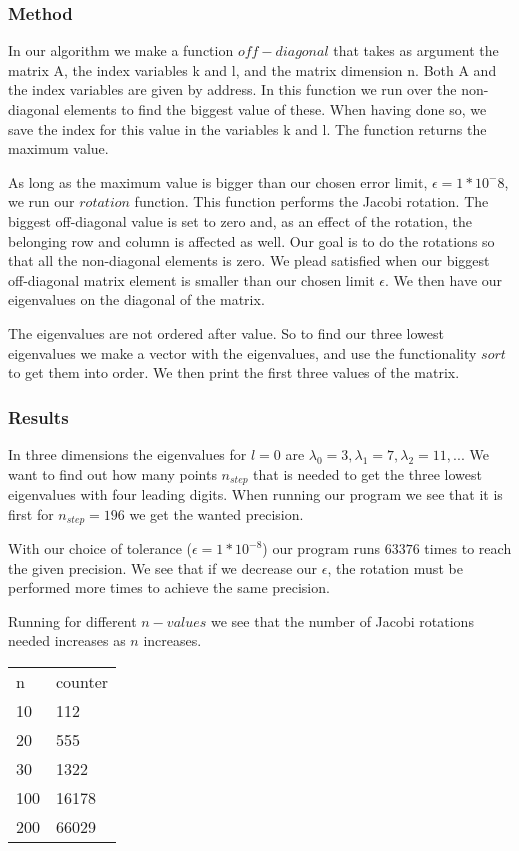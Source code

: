\documentclass[a4paper,12pt, english]{article}
\begin{document}
\subsubsection{Method}
In our algorithm we make a function $off-diagonal$ that takes as argument the matrix A, the index variables k and l, and the matrix dimension n. Both A and the index variables are given by address. In this function we run over the non-diagonal elements to find the biggest value of these. When having done so, we save the index for this value in the variables k and l. The function returns the maximum value. 

As long as the maximum value is bigger than our chosen error limit, $\epsilon = 1*10^-8$, we run our $rotation$ function. This function performs the Jacobi rotation. The biggest off-diagonal value is set to zero and, as an effect of the rotation, the belonging row and column is affected as well. Our goal is to do the rotations so that all the non-diagonal elements is zero. We plead satisfied when our biggest off-diagonal matrix element is smaller than our chosen limit $\epsilon$. We then have our eigenvalues on the diagonal of the matrix.
 
The eigenvalues are not ordered after value. So to find our three lowest eigenvalues we make a vector with the eigenvalues, and use the functionality $sort$ to get them into order. We then print the first three values of the matrix.
 
\subsubsection{Results}
In three dimensions the eigenvalues for $l=0$ are $\lambda_0 = 3, \lambda_1 = 7, \lambda_2 = 11,...$ We want to find out how many points $n_{step}$ that is needed to get the three lowest eigenvalues with four leading digits. When running our program we see that it is first for $n_{step} = 196$ we get the wanted precision. 
 
With our choice of tolerance ($\epsilon = 1*10^{-8}$) our program runs $63376$ times to reach the given precision. We see that if we decrease our $\epsilon$, the rotation must be performed more times to achieve the same precision. 

Running for different $n-values$ we see that the number of Jacobi rotations needed increases as $n$ increases.

\begin{center}
\begin{tabular}{l |  l }
n & counter \\
10 & 112   \\
20 & 555 \\
30 & 1322 \\
100 & 16178 \\
200 & 66029 \\
\end{tabular}
\end{center}  
\end{document}

